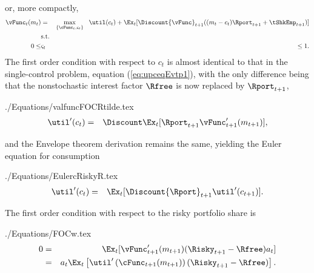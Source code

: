 \documentclass[titlepage]{\econtex}
\begin{document}

or, more compactly,
\begin{eqnarray*}
  {\vFunc}_{t}({m}_{t}) & = & \max_{\{\cFunc_{t},\varsigma_{t}\}} ~~  \util({c}_{t}) +  \Ex_{t}[\Discount {\vFunc}_{t+1}(({m}_{t}-{c}_{t}){\Rport}_{t+1} +        {\tShkEmp}_{t+1})]
  \\                       & \text{s.t.} & \nonumber
  \\ 0 \leq & \varsigma_{t} & \leq 1
                              .
\end{eqnarray*}
The first order condition with respect to ${c}_{t}$ is almost identical
to that in the single-control problem, equation (\ref{eq:upceqEvtp1}),
with the only difference being that the nonstochastic interest factor
$\Rfree$ is now replaced by ${\Rport}_{t+1}$,
\begin{verbatimwrite}{./Equations/valfuncFOCRtilde.tex}
  \begin{eqnarray}
    \util^{\prime}({c}_{t}) & = & \Discount \Ex_{t} [{\Rport}_{t+1} \vFunc^{\prime}_{t+1}({m}_{t+1})] \label{eq:valfuncFOCRtilde},
  \end{eqnarray}
\end{verbatimwrite}

and the Envelope theorem derivation remains the same, 
yielding the Euler equation for consumption
\begin{verbatimwrite}{./Equations/EulercRiskyR.tex}
  \begin{eqnarray}
    \util^{\prime}({c}_{t}) & = & \Ex_{t}[\Discount {\Rport}_{t+1} \util^{\prime}({c}_{t+1})]. \label{eq:EulercRiskyR}
  \end{eqnarray}
\end{verbatimwrite}


The first order condition with respect to the risky portfolio share is
\begin{verbatimwrite}{./Equations/FOCw.tex}
  \begin{eqnarray}
    0 & = & \Ex_{t}[{\vFunc}_{t+1}^{\prime}({m}_{t+1})(\Risky_{t+1}-\Rfree){a}_{t}] \notag
    \\        & = & {a}_{t}\Ex_{t}\left[\util^{\prime}\left(\cFunc_{t+1}({m}_{t+1})\right)(\Risky_{t+1}-\Rfree)\right] \label{eq:FOCw}.
  \end{eqnarray}
\end{verbatimwrite}

\end{document}
